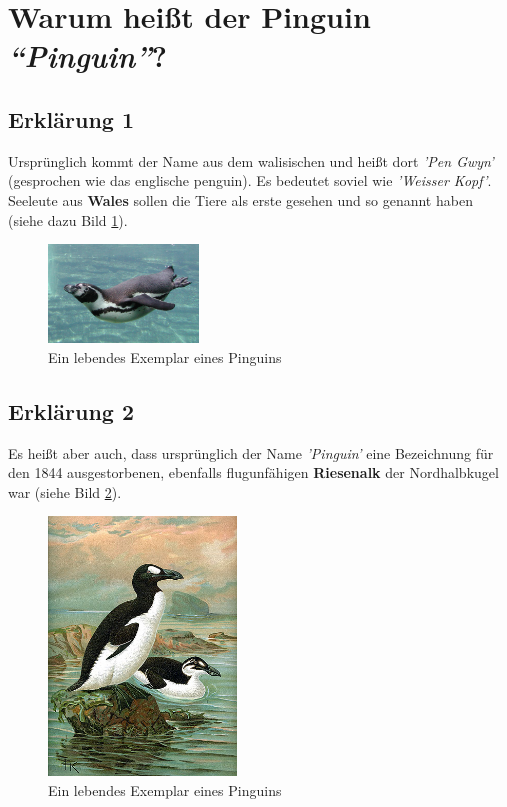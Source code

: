 
\section{Warum heißt der Pinguin \emph{"`Pinguin"'}?}
\subsection{Erklärung 1}
Ursprünglich kommt der Name aus dem walisischen und heißt dort \emph{'Pen Gwyn'} (gesprochen wie das englische penguin). Es bedeutet soviel wie \emph{'Weisser Kopf'}. Seeleute aus \textbf{Wales} sollen die Tiere als erste gesehen und so genannt haben (siehe dazu Bild \ref{img:pen}).

\begin{figure}[H]
	\begin{center}
		\includegraphics[width=4cm]{bilder/swim-Ping.jpg}
		\caption{Ein lebendes Exemplar eines Pinguins}
		\label{img:pen}
	\end{center}
\end{figure}

\subsection{Erklärung 2}
Es heißt aber auch, dass ursprünglich der Name \emph{'Pinguin'} eine Bezeichnung für den 1844 ausgestorbenen, ebenfalls flugunfähigen \textbf{Riesenalk} der Nordhalbkugel war (siehe Bild \ref{img:auk}).

\begin{figure}[H]
\begin{center}
\includegraphics[width=5cm]{bilder/GreatAuk.jpg}
\caption{Ein lebendes Exemplar eines Pinguins}
\label{img:auk}
\end{center}
\end{figure}


